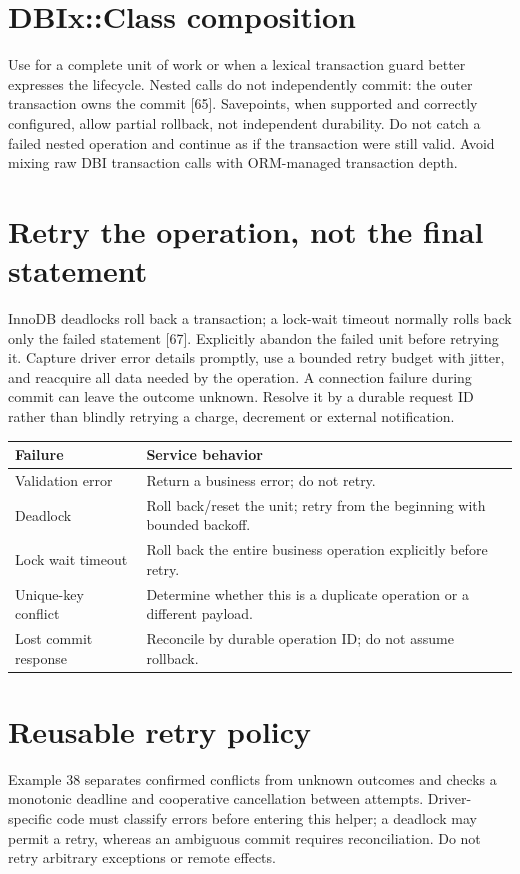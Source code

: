 \section{DBIx::Class composition}
Use  for a complete unit of work or 
when a lexical transaction guard better expresses the lifecycle.
Nested  calls do not independently commit: the outer transaction
owns the commit [65]. Savepoints, when supported and correctly configured,
allow partial rollback, not independent durability. Do not catch a failed
nested operation and continue as if the transaction were still valid.
Avoid mixing raw DBI transaction calls with ORM-managed transaction depth.

\section{Retry the operation, not the final statement}
InnoDB deadlocks roll back a transaction; a lock-wait timeout normally
rolls back only the failed statement [67]. Explicitly abandon the failed
unit before retrying it. Capture driver error details promptly, use a
bounded retry budget with jitter, and reacquire all data needed by the
operation. A connection failure during commit can leave the outcome
unknown. Resolve it by a durable request ID rather than blindly retrying
a charge, decrement or external notification.

\begin{longtable}{L{.30\linewidth}L{.62\linewidth}}
\toprule Failure & Service behavior \\ \midrule\endhead
Validation error & Return a business error; do not retry. \\
Deadlock & Roll back/reset the unit; retry from the beginning with bounded backoff. \\
Lock wait timeout & Roll back the entire business operation explicitly before retry. \\
Unique-key conflict & Determine whether this is a duplicate operation or a different payload. \\
Lost commit response & Reconcile by durable operation ID; do not assume rollback. \\
\bottomrule
\end{longtable}

\section{Reusable retry policy}
Example 38 separates confirmed conflicts from unknown outcomes and checks
a monotonic deadline and cooperative cancellation between attempts.
Driver-specific code must classify errors before entering this helper;
a deadlock may permit a retry, whereas an ambiguous commit requires
reconciliation. Do not retry arbitrary exceptions or remote effects.

